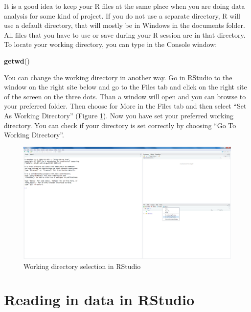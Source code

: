 \documentclass[
]{book}
\newenvironment{Shaded}{\begin{snugshade}}{\end{snugshade}}
\newcommand{\KeywordTok}[1]{\textcolor[rgb]{0.13,0.29,0.53}{\textbf{#1}}}
\newcommand{\NormalTok}[1]{#1}
\begin{document}
It is a good idea to keep your R files at the same place when you are doing data analysis for some kind of project. If you do not use a separate directory, R will use a default directory, that will mostly be in Windows in the documents folder. All files that you have to use or save during your R session are in that directory. To locate your working directory, you can type in the Console window:

\begin{Shaded}
\begin{Highlighting}[]
\KeywordTok{getwd}\NormalTok{()}
\end{Highlighting}
\end{Shaded}

You can change the working directory in another way. Go in RStudio to the window on the right site below and go to the Files tab and click on the right site of the screen on the three dots. Than a window will open and you can browse to your preferred folder. Then choose for More in the Files tab and then select ``Set As Working Directory'' (Figure \ref{fig:fig12}). Now you have set your preferred working directory. You can check if your directory is set correctly by choosing ``Go To Working Directory''.

\begin{figure}

{\centering \includegraphics[width=0.95\linewidth]{images/fig1.12} 

}

\caption{Working directory selection in RStudio}\label{fig:fig12}
\end{figure}

\hypertarget{reading-in-data-in-rstudio}{%
\section{Reading in data in RStudio}\label{reading-in-data-in-rstudio}}
\end{document}
